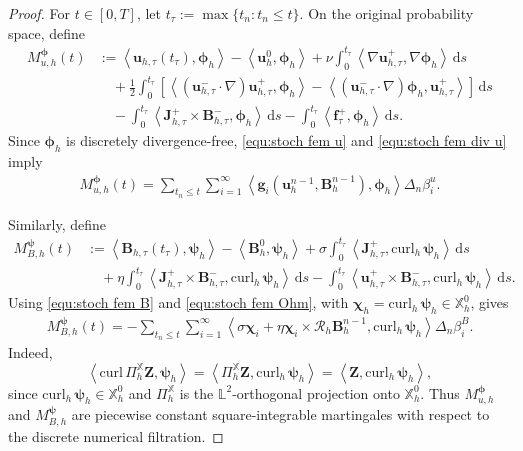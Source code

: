 \documentclass[11pt, reqno]{amsart}
\theoremstyle{definition}
\numberwithin{equation}{section}
\newcommand{\curl}{\mathrm{curl}\,}
\newcommand{\bff}{\boldsymbol}
\newcommand{\bb}{\mathbb}
\newcommand{\ds}{\,\mathrm{d}s}
\newcommand{\inpro}[2]{\left\langle#1,#2\right\rangle}
\newcommand{\curlh}{\mathrm{curl}_h\,}
\begin{document}
\begin{proof}
	For $t\in[0,T]$, let $t_\tau:=\max\{t_n:t_n\le t\}$.
	On the original probability space, define
	\begin{align}
		\label{equ:discrete residual u}
		M_{u,h}^{\bff\phi}(t)
		&:=
		\inpro{\bff u_{h,\tau}(t_\tau)}{\bff\phi_h}
		-
		\inpro{\bff u_h^0}{\bff\phi_h}
		+
		\nu\int_0^{t_\tau}
		\inpro{\nabla\bff u_{h,\tau}^{+}}
		{\nabla\bff\phi_h}\ds
		\nonumber\\
		&\quad
		+
		\frac12\int_0^{t_\tau}
		\left[
		\inpro{
			(\bff u_{h,\tau}^{-}\cdot\nabla)
			\bff u_{h,\tau}^{+}}
		{\bff\phi_h}
		-
		\inpro{
			(\bff u_{h,\tau}^{-}\cdot\nabla)\bff\phi_h}
		{\bff u_{h,\tau}^{+}}
		\right]\ds
		\nonumber\\
		&\quad
		-
		\int_0^{t_\tau}
		\inpro{
			\bff J_{h,\tau}^{+}\times\bff B_{h,\tau}^{-}}
		{\bff\phi_h}\ds
		-
		\int_0^{t_\tau}
		\inpro{\bff f_\tau^{+}}{\bff\phi_h}\ds .
	\end{align}
	Since $\bff\phi_h$ is discretely divergence-free,
	\eqref{equ:stoch fem u} and \eqref{equ:stoch fem div u} imply
	\begin{align*}
		M_{u,h}^{\bff\phi}(t)
		=
		\sum_{t_n\le t}
		\sum_{i=1}^{\infty}
		\inpro{
			\bff g_i(\bff u_h^{n-1},\bff B_h^{n-1})}
		{\bff\phi_h}
		\Delta_n\beta_i^u .
	\end{align*}
	
	Similarly, define
	\begin{align}
		\label{equ:discrete residual B}
		M_{B,h}^{\bff\psi}(t)
		&:=
		\inpro{\bff B_{h,\tau}(t_\tau)}{\bff\psi_h}
		-
		\inpro{\bff B_h^0}{\bff\psi_h}
		+
		\sigma\int_0^{t_\tau}
		\inpro{\bff J_{h,\tau}^{+}}{\curlh\bff\psi_h}\ds
		\nonumber\\
		&\quad
		+
		\eta\int_0^{t_\tau}
		\inpro{
			\bff J_{h,\tau}^{+}\times\bff B_{h,\tau}^{-}}
		{\curlh\bff\psi_h}\ds
		-
		\int_0^{t_\tau}
		\inpro{
			\bff u_{h,\tau}^{+}\times\bff B_{h,\tau}^{-}}
		{\curlh\bff\psi_h}\ds .
	\end{align}
	Using \eqref{equ:stoch fem B} and
	\eqref{equ:stoch fem Ohm}, with
	$\bff\chi_h=\curlh\bff\psi_h\in\bb X_h^0$, gives
	\begin{align*}
		M_{B,h}^{\bff\psi}(t)
		=
		-\sum_{t_n\le t}
		\sum_{i=1}^{\infty}
		\inpro{
			\sigma\bff\chi_i
			+
			\eta\bff\chi_i\times\mathcal R_h\bff B_h^{n-1}}
		{\curlh\bff\psi_h}
		\Delta_n\beta_i^B .
	\end{align*}
	Indeed,
	\[
	\inpro{\curl\Pi_h^{\bb X}\bff Z}{\bff\psi_h}
	=
	\inpro{\Pi_h^{\bb X}\bff Z}{\curlh\bff\psi_h}
	=
	\inpro{\bff Z}{\curlh\bff\psi_h},
	\]
	since $\curlh\bff\psi_h\in\bb X_h^0$ and
	$\Pi_h^{\bb X}$ is the $\bb L^2$-orthogonal projection onto
	$\bb X_h^0$.
	Thus $M_{u,h}^{\bff\phi}$ and $M_{B,h}^{\bff\psi}$ are piecewise constant
	square-integrable martingales with respect to the discrete numerical
	filtration.
	

\end{proof}
\end{document}
